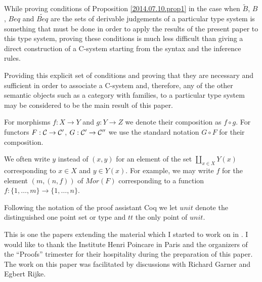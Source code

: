\documentclass[11pt]{article}
\newcommand{\sr}{\rightarrow}
\newcommand{\wt}{\widetilde}
\begin{document}
While proving conditions of Proposition \ref{2014.07.10.prop1} in the case when ${\wt{B}}$, ${B}$, ${Beq}$ and ${\wt{Beq}}$ are the sets of derivable judgements of a particular type system is something that must be done in order to apply the results of the present paper to this type system, proving these conditions is much less difficult than giving a direct construction of a C-system starting from the syntax and the inference rules.

Providing this explicit set of conditions and proving that they are necessary and sufficient in order to associate a C-system and, therefore, any of the other semantic objects such as a category with families, to a particular type system may be considered to be the main result of this paper. 

\vspace{5mm}

For morphisms $f:X\sr Y$ and $g:Y\sr Z$ we denote their composition as $f\circ g$. For functors $F:{\cal C}\sr {\cal C}'$, $G:{\cal C}'\sr {\cal C}''$ we use the standard notation $G\circ F$ for their composition. 

We often write $y$ instead of $(x,y)$ for an element of the set $\amalg_{x\in X} Y(x)$ corresponding to $x\in X$ and $y\in Y(x)$. For example, we may write $f$ for the element $(m,(n,f))$ of $Mor(F)$ corresponding to a function $f:\{1,\dots,m\}\sr\{1,\dots,n\}$. 

Following the notation of the proof assistant Coq we let $unit$ denote the distinguished one point set or type and $tt$ the only point of $unit$. 

This is one the papers extending the material which I started to work on in \cite{NTS}. I would like to thank the Institute Henri Poincare in Paris and the organizers of the ``Proofs'' trimester for their hospitality during the preparation of this paper. The work on this paper was facilitated by discussions with Richard Garner and Egbert Rijke. 
\end{document}
